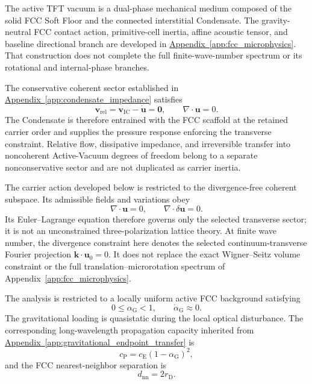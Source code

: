 The active TFT vacuum is a dual-phase mechanical medium composed of the solid
FCC Soft Floor and the connected interstitial Condensate. The gravity-neutral
FCC contact action, primitive-cell inertia, affine acoustic tensor, and
baseline directional branch are developed in
\hyperref[app:fcc_microphysics]{Appendix~\ref*{app:fcc_microphysics}}. That
construction does not complete the full finite-wave-number spectrum or its
rotational and internal-phase branches.

The conservative coherent sector established in
\hyperref[app:condensate_impedance]{Appendix~\ref*{app:condensate_impedance}}
satisfies
\begin{equation}
    \mathbf{v}_{\mathrm{rel}}
    =
    \mathbf{v}_{\mathrm{IC}}
    -
    \dot{\mathbf{u}}
    =
    \mathbf{0},
    \qquad
    \nabla\cdot\mathbf{u}
    =
    0.
    \label{eq:photon_relaxation_coherent_limit}
\end{equation}
The Condensate is therefore entrained with the FCC scaffold at the retained
carrier order and supplies the pressure response enforcing the transverse
constraint. Relative flow, dissipative impedance, and irreversible transfer
into noncoherent Active-Vacuum degrees of freedom belong to a separate
nonconservative sector and are not duplicated as carrier inertia.

The carrier action developed below is restricted to the divergence-free
coherent subspace. Its admissible fields and variations obey
\begin{equation}
    \nabla\cdot\mathbf{u}
    =
    0,
    \qquad
    \nabla\cdot\delta\mathbf{u}
    =
    0.
    \label{eq:photon_relaxation_transverse_variation}
\end{equation}
Its Euler--Lagrange equation therefore governs only the selected transverse
sector; it is not an unconstrained three-polarization lattice theory. At
finite wave number, the divergence constraint here denotes the selected
continuum-transverse Fourier projection
\(\mathbf k\cdot\mathbf u_0=0\). It does not replace the exact
Wigner--Seitz volume constraint or the full translation--microrotation
spectrum of Appendix~\ref{app:fcc_microphysics}.

The analysis is restricted to a locally uniform active FCC background
satisfying
\begin{equation}
    0
    \leq
    \alpha_{\mathrm G}
    <
    1,
    \qquad
    \dot{\alpha}_{\mathrm G}
    \approx
    0.
    \label{eq:photon_relaxation_state_domain}
\end{equation}
The gravitational loading is quasistatic during the local optical disturbance.
The corresponding long-wavelength propagation capacity inherited from
\hyperref[app:gravitational_endpoint_transfer]
{Appendix~\ref*{app:gravitational_endpoint_transfer}} is
\begin{equation}
    c_{\mathrm P}
    =
    c_{\mathrm E}
    \left(
        1-\alpha_{\mathrm G}
    \right)^2,
    \label{eq:photon_relaxation_loaded_capacity}
\end{equation}
and the FCC nearest-neighbor separation is
\begin{equation}
    d_{\mathrm{nn}}
    =
    2r_{\mathrm D}.
    \label{eq:photon_relaxation_neighbor_spacing}
\end{equation}

